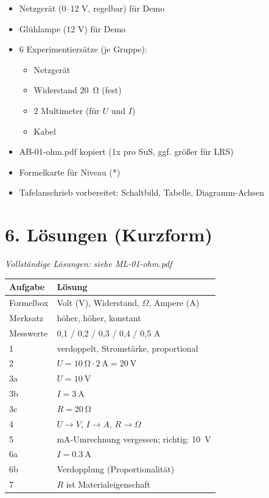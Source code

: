 \documentclass[11pt, a4paper]{article}
\begin{document}
\begin{itemize}
    \item[$\Box$] Netzgerät (0--12 V, regelbar) für Demo
    \item[$\Box$] Glühlampe (12 V) für Demo
    \item[$\Box$] 6 Experimentiersätze (je Gruppe):
    \begin{itemize}
        \item Netzgerät
        \item Widerstand \SI{20}{\ohm} (fest)
        \item 2 Multimeter (für $U$ und $I$)
        \item Kabel
    \end{itemize}
    \item[$\Box$] AB-01-ohm.pdf kopiert (1x pro SuS, ggf. größer für LRS)
    \item[$\Box$] Formelkarte für Niveau (*)
    \item[$\Box$] Tafelanschrieb vorbereitet: Schaltbild, Tabelle, Diagramm-Achsen
\end{itemize}


\section*{6. Lösungen (Kurzform)}

\textit{Vollständige Lösungen: siehe ML-01-ohm.pdf}

\vspace{0.5em}

\begin{tabular}{|l|l|}
\hline
\textbf{Aufgabe} & \textbf{Lösung} \\
\hline
Formelbox & Volt (V), Widerstand, $\Omega$, Ampere (A) \\
\hline
Merksatz & höher, höher, konstant \\
\hline
Messwerte & 0,1 / 0,2 / 0,3 / 0,4 / 0,5 A \\
\hline
1 & verdoppelt, Stromstärke, proportional \\
\hline
2 & $U = \SI{10}{\ohm} \cdot \SI{2}{\ampere} = \SI{20}{\volt}$ \\
\hline
3a & $U = \SI{10}{\volt}$ \\
\hline
3b & $I = \SI{3}{\ampere}$ \\
\hline
3c & $R = \SI{20}{\ohm}$ \\
\hline
4 & $U \to V$, $I \to A$, $R \to \Omega$ \\
\hline
5 & mA-Umrechnung vergessen; richtig: \SI{10}{\volt} \\
\hline
6a & $I = \SI{0,3}{\ampere}$ \\
\hline
6b & Verdopplung (Proportionalität) \\
\hline
7 & $R$ ist Materialeigenschaft \\
\hline
\end{tabular}
\end{document}
